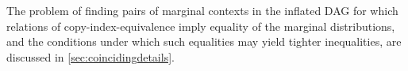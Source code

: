 The problem of finding pairs of marginal contexts in the inflated DAG for which relations of copy-index-equivalence imply equality of the marginal distributions, and the conditions under which such equalities may yield tighter inequalities, are discussed in \cref{sec:coincidingdetails}.







